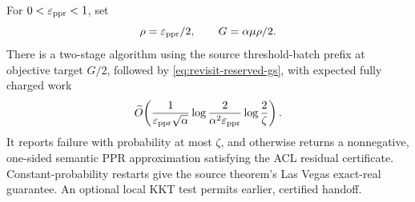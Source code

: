 \begin{theorem}
\label{thm:revisit-randomized-gs}
For $0<\varepsilon_{\mathrm{ppr}}<1$, set
\[
 \rho=\varepsilon_{\mathrm{ppr}}/2,\qquad G=\alpha\mu\rho/2.
\]
There is a two-stage algorithm using the source threshold-batch prefix
at objective target $G/2$, followed by
\cref{eq:revisit-reserved-gs}, with expected fully charged work
\[
 \widetilde O\!\left(
 \frac1{\varepsilon_{\mathrm{ppr}}\sqrt\alpha}
 \log\frac2{\alpha^2\varepsilon_{\mathrm{ppr}}}\log\frac2\zeta\right).
\]
It reports failure with probability at most $\zeta$, and otherwise returns
a nonnegative, one-sided semantic PPR approximation satisfying the ACL
residual certificate. Constant-probability restarts give the source
theorem's Las Vegas exact-real guarantee.
An optional local KKT test permits earlier, certified handoff.
\end{theorem}
